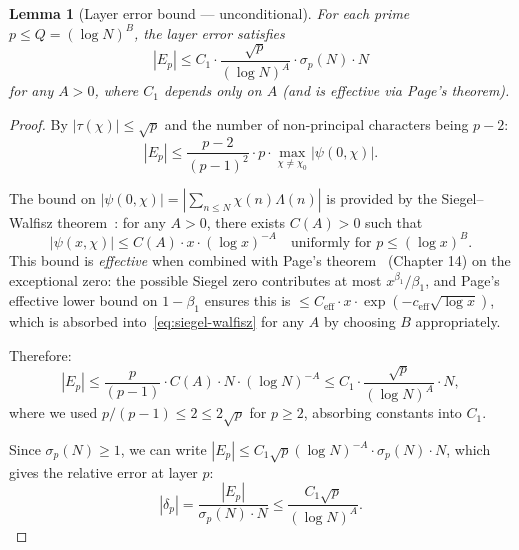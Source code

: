 \documentclass[11pt,a4paper]{article}
\newtheorem{lemma}[theorem]{Lemma}
\theoremstyle{remark}
\begin{document}
\begin{lemma}[Layer error bound --- unconditional]
\label{lem:layer-error}
For each prime $p \leq Q = (\log N)^B$, the layer error satisfies
\begin{equation}
\label{eq:layer-bound}
  |E_p| \leq C_1 \cdot \frac{\sqrt{p}}{(\log N)^A} \cdot \sigma_p(N) \cdot N
\end{equation}
for any $A > 0$, where $C_1$ depends only on $A$ (and is effective via
Page's theorem).
\end{lemma}

\begin{proof}
By $|\tau(\chi)| \leq \sqrt{p}$ and the number of non-principal characters
being $p-2$:
\begin{equation}
  |E_p| \leq \frac{p-2}{(p-1)^2} \cdot p \cdot \max_{\chi \neq \chi_0}
    |\psi(0,\chi)|.
\end{equation}

The bound on $|\psi(0,\chi)| = |\sum_{n \leq N}\chi(n)\Lambda(n)|$ is
provided by the Siegel--Walfisz theorem~\cite[Ch.~24]{Davenport2000}:
for any $A > 0$, there exists $C(A) > 0$ such that
\begin{equation}
\label{eq:siegel-walfisz}
  |\psi(x,\chi)| \leq C(A) \cdot x \cdot (\log x)^{-A}
  \quad \text{uniformly for } p \leq (\log x)^B.
\end{equation}
This bound is \emph{effective} when combined with Page's
theorem~\cite{Davenport2000} (Chapter 14) on the exceptional zero:
the possible Siegel zero contributes at most $x^{\beta_1}/\beta_1$, and
Page's effective lower bound on $1-\beta_1$ ensures this is
$\leq C_{\text{eff}} \cdot x \cdot \exp(-c_{\text{eff}}\sqrt{\log x})$,
which is absorbed into~\eqref{eq:siegel-walfisz} for any $A$ by choosing
$B$ appropriately.

Therefore:
\begin{equation}
  |E_p| \leq \frac{p}{(p-1)} \cdot C(A) \cdot N \cdot (\log N)^{-A}
    \leq C_1 \cdot \frac{\sqrt{p}}{(\log N)^A} \cdot N,
\end{equation}
where we used $p/(p-1) \leq 2 \leq 2\sqrt{p}$ for $p \geq 2$, absorbing
constants into $C_1$.

Since $\sigma_p(N) \geq 1$, we can write
$|E_p| \leq C_1\sqrt{p}(\log N)^{-A} \cdot \sigma_p(N) \cdot N$,
which gives the relative error at layer $p$:
\begin{equation}
\label{eq:delta-p-bound}
  |\delta_p| = \frac{|E_p|}{\sigma_p(N) \cdot N} \leq \frac{C_1\sqrt{p}}{(\log N)^A}.
\end{equation}
\end{proof}
\end{document}
